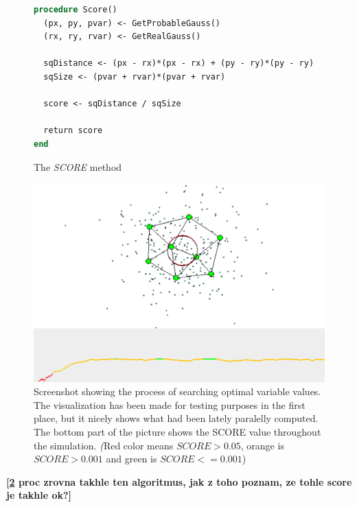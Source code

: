\begin{figure}
\begin{lstlisting}[language=Pascal]
procedure Score()
  (px, py, pvar) <- GetProbableGauss()
  (rx, ry, rvar) <- GetRealGauss()
  
  sqDistance <- (px - rx)*(px - rx) + (py - ry)*(py - ry)
  sqSize <- (pvar + rvar)*(pvar + rvar)
  
  score <- sqDistance / sqSize
  
  return score
end
\end{lstlisting}       
\caption{The \emph{SCORE} method}
\label{usedalgo:scoremethod}
\end{figure}
       
\begin{figure}      
\begin{center}
\includegraphics[scale=0.75]{images/gng/experimental_setup.eps}    
\caption{Screenshot showing the process of searching optimal variable values. The visualization has been made for testing purposes in the first place, but it nicely shows what had been lately paralelly computed. The bottom part of the picture shows the SCORE value throughout the simulation. {\emph (Red color means $SCORE > 0.05$, orange is $SCORE > 0.001$ and green is $SCORE <= 0.001$)} }
\end{center}                          
\label{usedalgo:gngexperimentscreen}
\end{figure}
\textbf{[\ref{usedalgo:gngexperimentscreen} proc zrovna takhle ten algoritmus, jak z toho poznam, ze tohle score je takhle ok?]}

